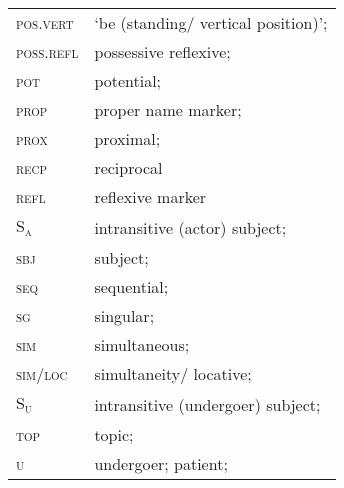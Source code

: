 \documentclass[output=paper]{langscibook}
\begin{document}
\begin{tabularx}{\textwidth}{lQ}
\textsc{pos.vert} & `be (standing/ vertical position)'; \\
\textsc{poss.refl}   & possessive reflexive;   \\
\textsc{pot}   & potential;  \\
\textsc{prop}  & proper name marker;  \\
\textsc{prox}  & proximal;   \\
\textsc{recp}   & reciprocal  \\
\textsc{refl}   & reflexive marker  \\
\textsc{S\textsubscript{a}}  & intransitive (actor) subject; \\
\textsc{sbj}   & subject;    \\
\textsc{seq}   & sequential;    \\
\textsc{sg } & singular;   \\
\textsc{sim} & simultaneous;  \\
\textsc{sim/loc}  & simultaneity/ locative; \\
\textsc{S\textsubscript{u}}  & intransitive (undergoer) subject;   \\
\textsc{top} & topic;   \\
\textsc{u}  & undergoer; patient;   \\
\end{tabularx}

{\sloppy\printbibliography[heading=subbibliography,notkeyword=this]}
\end{document}
